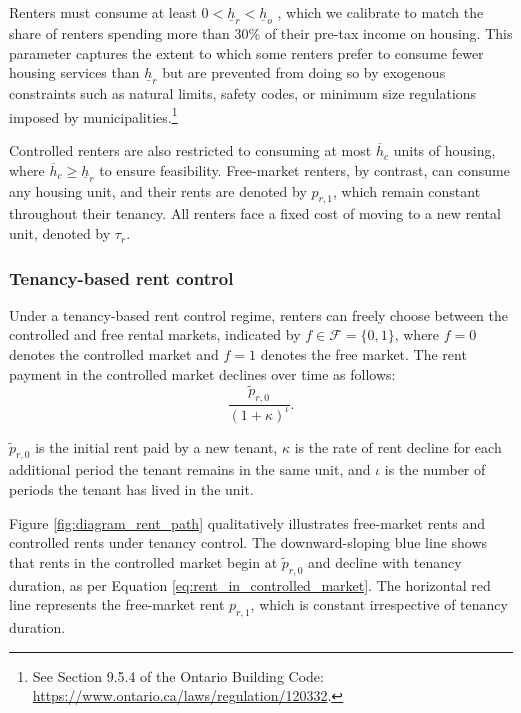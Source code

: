 \documentclass[parskip=full]{article}
\begin{document}
Renters must consume at least $0<\underline{h}_{r}<\underline{h}_{o}$ \citep{gervais,sommeretal-2013,sommersullivan-2017,kaplanetal-2019}, which we calibrate to match the share of renters spending more than 30\% of their pre-tax income on housing. This parameter captures the extent to which some renters prefer to consume fewer housing services than $\underline{h}_{r}$ but are prevented from doing so by exogenous constraints such as natural limits, safety codes, or minimum size regulations imposed by municipalities.\footnote{See Section 9.5.4 of the Ontario Building Code: \url{https://www.ontario.ca/laws/regulation/120332}.} 

Controlled renters are also restricted to consuming at most $\overline{h}_c$ units of housing, where $\overline{h}_c \geq \underline{h}_r$ to ensure feasibility. Free-market renters, by contrast, can consume any housing unit, and their rents are denoted by $p_{r,1}$, which remain constant throughout their tenancy. All renters face a fixed cost of moving to a new rental unit, denoted by $\tau_r$.

\subsubsection{Tenancy-based rent control}

Under a tenancy-based rent control regime, renters can freely choose between the controlled and free rental markets, indicated by $f \in \mathcal{F}=\{0,1\}$, where $f=0$ denotes the controlled market and $f=1$ denotes the free market. The rent payment in the controlled market declines over time as follows:
\begin{equation}\label{eq:rent_in_controlled_market}
\frac{\tilde{p}_{r,0}}{(1+\kappa)^{\iota}}.
\end{equation} 

\noindent $\tilde{p}_{r,0}$ is the initial rent paid by a new tenant, $\kappa$ is the rate of rent decline for each additional period the tenant remains in the same unit, and $\iota$ is the number of periods the tenant has lived in the unit. 

Figure \ref{fig:diagram_rent_path} qualitatively illustrates free-market rents and controlled rents under tenancy control. The downward-sloping blue line shows that rents in the controlled market begin at $\tilde{p}_{r,0}$ and decline with tenancy duration, as per Equation \eqref{eq:rent_in_controlled_market}. The horizontal red line represents the free-market rent $p_{r,1}$, which is constant irrespective of tenancy duration. 
\end{document}
